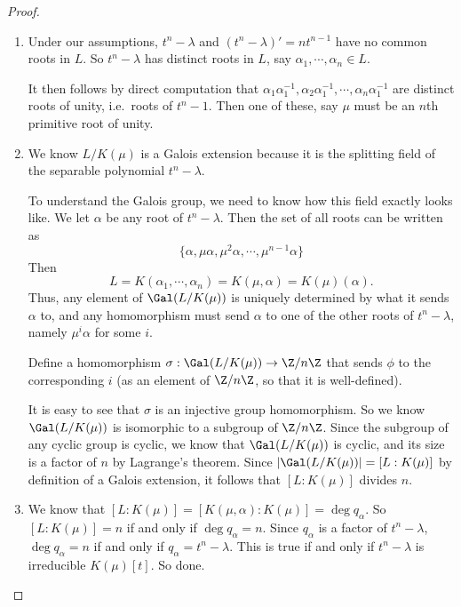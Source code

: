 \documentclass[a4paper]{article}
\begin{document}
\begin{proof}\leavevmode
  \begin{enumerate}
    \item Under our assumptions, $t^n - \lambda$ and $(t^n - \lambda)' = nt^{n - 1}$ have no common roots in $L$. So $t^n - \lambda$ has distinct roots in $L$, say $\alpha_1, \cdots, \alpha_n \in L$.

      It then follows by direct computation that $\alpha_1 \alpha_1^{-1}, \alpha_2 \alpha_1^{-1}, \cdots, \alpha_n \alpha_1^{-1}$ are distinct roots of unity, i.e.\ roots of $t^n - 1$. Then one of these, say $\mu$ must be an $n$th primitive root of unity.
    \item We know $L/K(\mu)$ is a Galois extension because it is the splitting field of the separable polynomial $t^n - \lambda$.

      To understand the Galois group, we need to know how this field exactly looks like. We let $\alpha$ be any root of $t^n - \lambda$. Then the set of all roots can be written as
      \[
        \{\alpha, \mu\alpha, \mu^2 \alpha, \cdots, \mu^{n - 1} \alpha\}
      \]
      Then
      \[
        L = K(\alpha_1, \cdots, \alpha_n) = K(\mu, \alpha) = K(\mu)(\alpha).
      \]
      Thus, any element of $\Gal(L/K(\mu))$ is uniquely determined by what it sends $\alpha$ to, and any homomorphism must send $\alpha$ to one of the other roots of $t^n - \lambda$, namely $\mu^i \alpha$ for some $i$.

      Define a homomorphism $\sigma: \Gal(L/K(\mu)) \to \Z/n\Z$ that sends $\phi$ to the corresponding $i$ (as an element of $\Z/n\Z$, so that it is well-defined).

      It is easy to see that $\sigma$ is an injective group homomorphism. So we know $\Gal(L/K(\mu))$ is isomorphic to a subgroup of $\Z/n\Z$. Since the subgroup of any cyclic group is cyclic, we know that $\Gal(L/K(\mu))$ is cyclic, and its size is a factor of $n$ by Lagrange's theorem. Since $|\Gal(L/K(\mu))| = [L:K(\mu)]$ by definition of a Galois extension, it follows that $[L:K(\mu)]$ divides $n$.

    \item We know that $[L:K(\mu)] = [K(\mu, \alpha): K(\mu)] = \deg q_\alpha$. So $[L:K(\mu)] = n$ if and only if $\deg q_\alpha = n$. Since $q_\alpha$ is a factor of $t^n - \lambda$, $\deg q_\alpha = n$ if and only if $q_\alpha = t^n - \lambda$. This is true if and only if $t^n - \lambda$ is irreducible $K(\mu)[t]$. So done.
  \end{enumerate}
\end{proof}
\end{document}
